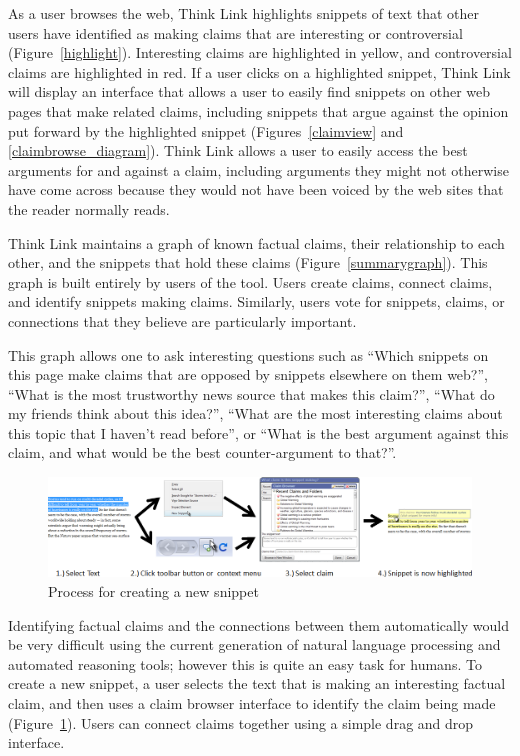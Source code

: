 \documentclass{chi2009}
\begin{document}
As a user browses the web, Think Link highlights snippets of text that other users have identified as making claims that are interesting or controversial (Figure~\ref{highlight}). Interesting claims are highlighted in yellow, and controversial claims are highlighted in red. If a user clicks on a highlighted snippet, Think Link will display an interface that allows a user to easily find snippets on other web pages that make related claims, including snippets that argue against the opinion put forward by the highlighted snippet (Figures~\ref{claimview} and \ref{claimbrowse_diagram}). Think Link allows a user to easily access the best arguments for and against a claim, including arguments they might not otherwise have come across because they would not have been voiced by the web sites that the reader normally reads.

Think Link maintains a graph of known factual claims, their relationship to each other, and the snippets that hold these claims (Figure~\ref{summarygraph}). This graph is built entirely by users of the tool. Users create claims, connect claims, and identify snippets making claims. Similarly, users vote for snippets, claims, or connections that they believe are particularly important.

This graph allows one to ask interesting questions such as ``Which snippets on this page make claims that are opposed by snippets elsewhere on them web?'', ``What is the most trustworthy news source that makes this claim?'', ``What do my friends think about this idea?'', ``What are the most interesting claims about this topic that I haven't read before'', or ``What is the best argument against this claim, and what would be the best counter-argument to that?''.

\begin{figure}[tb]
	\begin{center}
	\includegraphics[width=14cm]{../screenshots/newsnip_all.png}
	\caption{Process for creating a new snippet}
	\label{createprocess}
	\end{center}
\end{figure}

Identifying factual claims and the connections between them automatically would be very difficult using the current generation of natural language processing and automated reasoning tools; however this is quite an easy task for humans.  To create a new snippet, a user selects the text that is making an interesting factual claim, and then uses a claim browser interface to identify the claim being made (Figure~\ref{createprocess}). Users can connect claims together using a simple drag and drop interface.
\end{document}
